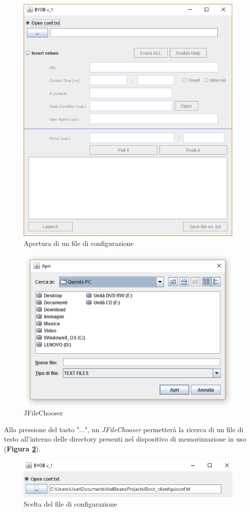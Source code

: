 \begin{figure}[!htb]
	\centering
	\includegraphics[width=0.7\linewidth]{./imgs/gui}
	\caption{Apertura di un file di configurazione}\label{fig:gui}
	\vspace*{0.5cm}
\end{figure}

\begin{figure}[!htb]
        \centering
		\includegraphics[width=0.6\linewidth]{./imgs/scelta1}
        \caption{JFileChooser}
        \label{fig:chooser}
\end{figure}

Alla pressione del tasto "...", un \textit{JFileChooser} permetter\`{a} la ricerca di un file di testo all'interno delle directory presenti nel dispositivo di memorizzazione in uso (\textbf{Figura \ref{fig:chooser}}).

\begin{figure}[!htb]
        \centering
		\includegraphics[width=0.7\linewidth]{./imgs/scelta11}
        \caption{Scelta del file di configurazione}
        \label{fig:conf}
\end{figure}

